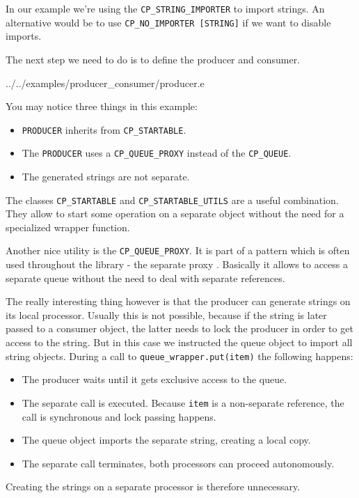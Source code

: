 \documentclass[a4paper,10pt]{report}
\begin{document}
In our example we're using the \lstinline!CP_STRING_IMPORTER! to import strings.
An alternative would be to use \lstinline!CP_NO_IMPORTER [STRING]! if we want to disable imports.

The next step we need to do is to define the producer and consumer.

 {../../examples/producer_consumer/producer.e}

You may notice three things in this example:

\begin{itemize}
 \item \lstinline!PRODUCER! inherits from \lstinline!CP_STARTABLE!.
 \item The \lstinline!PRODUCER! uses a \lstinline!CP_QUEUE_PROXY! instead of the \lstinline!CP_QUEUE!.
 \item The generated strings are not separate.
\end{itemize}

The classes \lstinline!CP_STARTABLE! and \lstinline!CP_STARTABLE_UTILS! are a useful combination.
They allow to start some operation on a separate object without the need for a specialized wrapper function.

Another nice utility is the \lstinline!CP_QUEUE_PROXY!.
It is part of a pattern which is often used throughout the library - the separate proxy .
Basically it allows to access a separate queue without the need to deal with separate references.

The really interesting thing however is that the producer can generate strings on its local processor.
Usually this is not possible, because if the string is later passed to a consumer object, the latter needs to lock the producer in order to get access to the string.
But in this case we instructed the queue object to import all string objects. During a call to \lstinline!queue_wrapper.put(item)! the following happens:
\begin{itemize}
 \item The producer waits until it gets exclusive access to the queue.
 \item The separate call is executed. Because \lstinline!item! is a non-separate reference, the call is synchronous and lock passing happens.
 \item The queue object imports the separate string, creating a local copy.
 \item The separate call terminates, both processors can proceed autonomously.
\end{itemize}
Creating the strings on a separate processor is therefore unnecessary.
\end{document}
